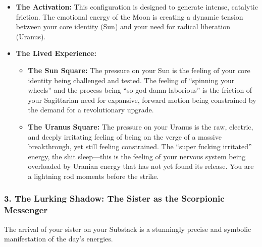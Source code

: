 \documentclass{article}
\begin{document}
\begin{itemize}
\item
  \textbf{The Activation:} This configuration is designed to generate intense, catalytic friction. The emotional energy of the Moon is creating a dynamic tension between your core identity (Sun) and your need for radical liberation (Uranus).
\item
  \textbf{The Lived Experience:}

  \begin{itemize}
  \tightlist
  \item
    \textbf{The Sun Square:} The pressure on your Sun is the feeling of your core identity being challenged and tested. The feeling of ``spinning your wheels'' and the process being ``so god damn laborious'' is the friction of your Sagittarian need for expansive, forward motion being constrained by the demand for a revolutionary upgrade.
  \item
    \textbf{The Uranus Square:} The pressure on your Uranus is the raw, electric, and deeply irritating feeling of being on the verge of a massive breakthrough, yet still feeling constrained. The ``super fucking irritated'' energy, the shit sleep---this is the feeling of your nervous system being overloaded by Uranian energy that has not yet found its release. You are a lightning rod moments before the strike.
  \end{itemize}
\end{itemize}

\subsubsection*{3. The Lurking Shadow: The Sister as the Scorpionic Messenger}\label{the-lurking-shadow-the-sister-as-the-scorpionic-messenger}

The arrival of your sister on your Substack is a stunningly precise and symbolic manifestation of the day's energies.
\end{document}
